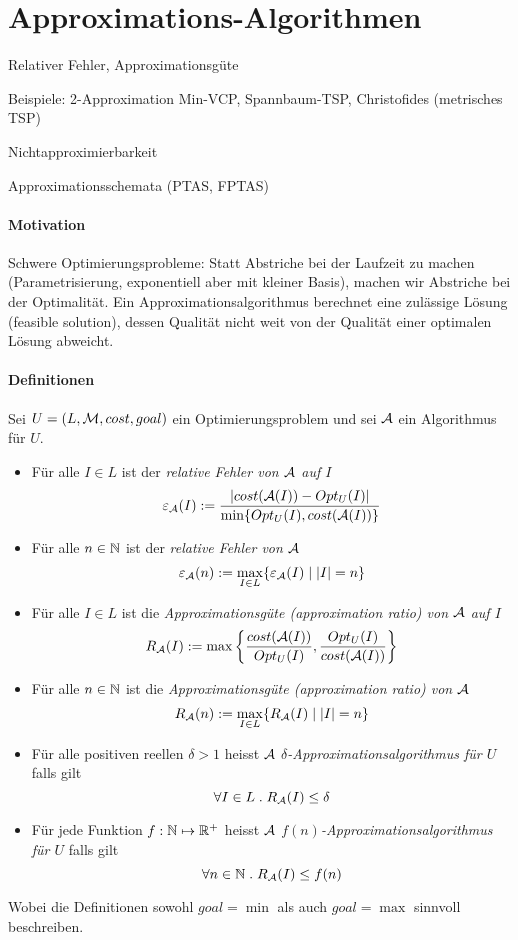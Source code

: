 \section{Approximations-Algorithmen}

\begin{takeaway}
    \item Relativer Fehler, Approximationsgüte
    \item Beispiele: 2-Approximation Min-VCP, Spannbaum-TSP, Christofides (metrisches TSP)
    \item Nichtapproximierbarkeit
    \item Approximationsschemata (PTAS, FPTAS)
\end{takeaway}

\paragraph{Motivation}
Schwere Optimierungsprobleme: Statt Abstriche bei der Laufzeit zu machen (Parametrisierung,
exponentiell aber mit kleiner Basis), machen wir Abstriche bei der Optimalität.
Ein Approximationsalgorithmus berechnet eine zulässige Lösung (feasible solution), dessen Qualität
nicht weit von der Qualität einer optimalen Lösung abweicht.

\paragraph{Definitionen}
Sei $U = (L, \mathcal{M}, cost, goal)$ ein Optimierungsproblem und sei $\mathcal{A}$ ein Algorithmus für $U$.
{
\newcommand{\opt}{Opt_U(I)}
\newcommand{\cost}{cost(\A(I))}
\begin{itemize}
    \item Für alle $I \in L$ ist der \emph{relative Fehler von $\mathcal{A}$ auf $I$}
    $$ \varepsilon_\A(I) := \frac{|\cost - \opt|}{\min \{ \opt, \cost \} } $$
    \item Für alle $n \in \mathbb{N}$ ist der \emph{relative Fehler von $\mathcal{A}$}
    $$ \varepsilon_{\mathcal{A}}(n) := \max_{I \in L} \{ \varepsilon_{\mathcal{A}}(I) \; | \; |I|=n \} $$
    \item Für alle $I \in L$ ist die \emph{Approximationsgüte (approximation ratio) von $\mathcal{A}$ auf $I$}
    $$ R_\A(I) := \max \left\{ \frac{\cost}{\opt}, \frac{\opt}{\cost} \right\} $$
    \item Für alle $n \in \mathbb{N}$ ist die \emph{Approximationsgüte (approximation ratio) von $\mathcal{A}$}
    $$ R_{\mathcal{A}}(n) := \max_{I \in L} \{ R_{\mathcal{A}}(I) \; | \; |I|=n \} $$
    \item Für alle positiven reellen $\delta > 1$ heisst $\mathcal{A}$ \emph{$\delta$-Approximationsalgorithmus für $U$} falls gilt
    $$ \forall I \in L \; . \; R_{\mathcal{A}}(I) \leq \delta $$
    \item Für jede Funktion $f : \mathbb{N} \mapsto \mathbb{R}^+$ heisst $\mathcal{A}$ \emph{$f(n)$-Approximationsalgorithmus für $U$} falls gilt
    $$ \forall n \in \mathbb{N} \; . \; R_{\mathcal{A}}(I) \leq f(n) $$
\end{itemize}
Wobei die Definitionen sowohl $goal=\min$ als auch $goal=\max$ sinnvoll beschreiben.
}

